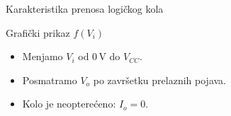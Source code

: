 \begin{frame}[label=08-s015]{Karakteristika prenosa logičkog kola}
\centering\par\medskip
Grafički prikaz $f(V_i)$\par\medskip\raggedright
\begin{itemize}
\item Menjamo $V_i$ od $0\,\mathrm V$ do $V_{CC}$.
\item Posmatramo $V_o$ po završetku prelaznih pojava.
\item Kolo je neopterećeno: $I_o=0$.
\end{itemize}
\end{frame}
